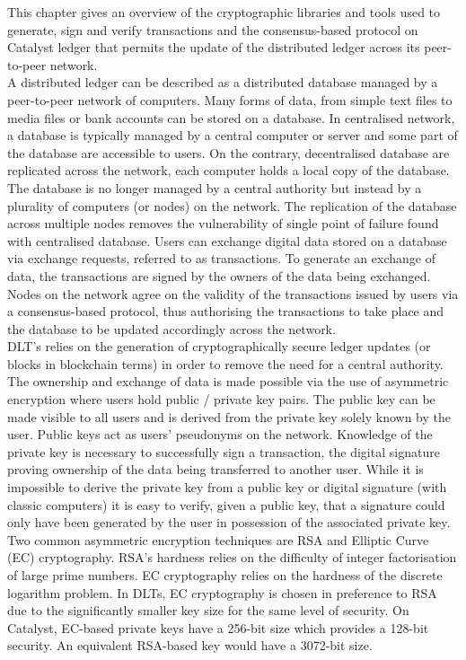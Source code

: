 This chapter gives an overview of the cryptographic libraries and tools used to generate, sign and verify transactions and the consensus-based protocol on Catalyst ledger that permits the update of the distributed ledger across its peer-to-peer network. \\

A distributed ledger can be described as a distributed database managed by a peer-to-peer network of computers. Many forms of data, from simple text files to media files or bank accounts can be stored on a database. In centralised network, a database is typically managed by a central computer or server and some part of the database are accessible to users. On the contrary, decentralised database are replicated across the network, each computer holds a local copy of the database. The database is no longer managed by a central authority but instead by a plurality of computers (or nodes) on the network. The replication of the database across multiple nodes removes the vulnerability of single point of failure found with centralised database. Users can exchange digital data stored on a database via exchange requests, referred to as transactions. To generate an exchange of data, the transactions are signed by the owners of the data being exchanged. Nodes on the network agree on the validity of the transactions issued by users via a consensus-based protocol, thus authorising the transactions to take place and the database to be updated accordingly across the network. \\

DLT's relies on the generation of cryptographically secure ledger updates (or blocks in blockchain terms) in order to remove the need for a central authority. The ownership and exchange of data is made possible via the use of asymmetric encryption where users hold public / private key pairs. The public key can be made visible to all users and is derived from the private key solely known by the user. Public keys act as users' pseudonyms on the network. Knowledge of the private key is necessary to successfully sign a transaction, the digital signature proving ownership of the data being transferred to another user. While it is impossible to derive the private key from a public key or digital signature (with classic computers) it is easy to verify, given a public key, that a signature could only have been generated by the user in possession of the associated private key. \\

Two common asymmetric encryption techniques are RSA and Elliptic Curve (EC) cryptography. RSA's hardness relies on the difficulty of integer factorisation of large prime numbers. EC cryptography relies on the hardness of the discrete logarithm problem. In DLTs, EC cryptography is chosen in preference to RSA due to the significantly smaller key size for the same level of security. On Catalyst, EC-based private keys have a 256-bit size which provides a 128-bit security. An equivalent RSA-based key would have a 3072-bit size.

